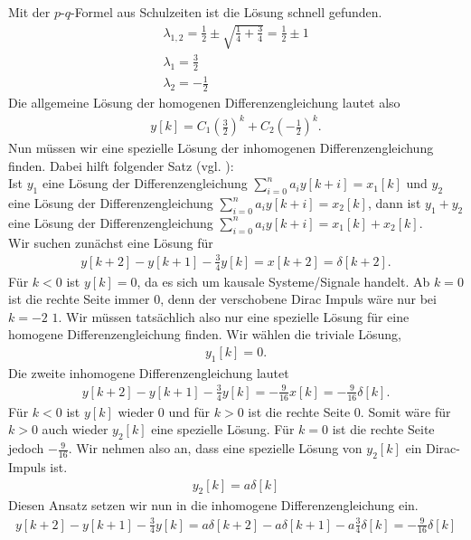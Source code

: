 \documentclass[11pt,a4paper,DIV=12]{scrartcl}
\begin{document}
%
Mit der $p$-$q$-Formel aus Schulzeiten ist die Lösung schnell gefunden.
%
\begin{gather}
	\lambda_{1,2}=\frac{1}{2}\pm \sqrt{\frac{1}{4}+\frac{3}{4}}=\frac{1}{2}\pm 1\\
	\lambda_1=\frac{3}{2}\\
	\lambda_2=-\frac{1}{2}
\end{gather}
%
Die allgemeine Lösung der homogenen Differenzengleichung lautet also
%
\begin{gather}
	y[k]=C_1\left(\frac{3}{2}\right)^k+C_2\left(-\frac{1}{2}\right)^k.
\end{gather}
%
Nun müssen wir eine spezielle Lösung der inhomogenen Differenzengleichung 
finden. 
%
Dabei hilft folgender Satz (vgl. \cite[Kap. 5 S. 83]{Witt2013}):\\
%
Ist $y_1$ eine Lösung der Differenzengleichung $\sum_{i=0}^na_iy[k+i]=x_1[k]$ 
und $y_2$ eine Lösung der Differenzengleichung $\sum_{i=0}^na_iy[k+i]=x_2[k]$, 
dann ist $y_1+y_2$ eine Lösung der Differenzengleichung 
$\sum_{i=0}^{n}a_iy[k+i]=x_1[k]+x_2[k]$.\\
%
Wir suchen zunächst eine Lösung für
%
\begin{gather}
	y[k+2]-y[k+1]-\frac{3}{4}y[k]=x[k+2]=\delta[k+2].
\end{gather}
%
Für $k<0$ ist $y[k]=0$, da es sich um kausale Systeme/Signale handelt. 
%
Ab $k=0$ ist die rechte Seite immer $0$, denn der verschobene Dirac Impuls wäre 
nur bei $k=-2$ $1$. Wir müssen tatsächlich also nur eine spezielle Lösung für 
eine homogene Differenzengleichung finden. 
%
Wir wählen die triviale Lösung,
%
\begin{gather}
	y_1[k]=0.
\end{gather}
%
Die zweite inhomogene Differenzengleichung lautet
%
\begin{gather}
	y[k+2]-y[k+1]-\frac{3}{4}y[k]=-\frac{9}{16}x[k]=-\frac{9}{16}\delta[k].
\end{gather}
%
Für $k<0$ ist $y[k]$ wieder $0$ und für $k>0$ ist die rechte Seite $0$. 
%
Somit wäre für $k>0$ auch wieder $y_2[k]$ eine spezielle Lösung. 
%
Für $k=0$ ist die rechte Seite jedoch $-\frac{9}{16}$. 
%
Wir nehmen also an, dass eine spezielle Lösung von $y_2[k]$ ein 
Dirac-Impuls ist.
%
\begin{gather}
	y_2[k]=a\delta[k]
\end{gather}
%
Diesen Ansatz setzen wir nun in die inhomogene Differenzengleichung ein.
%
\begin{gather}
	y[k+2]-y[k+1]-\frac{3}{4}y[k]=a\delta[k+2]-a\delta[k+1]-a\frac{3}{4}\delta[k]=-\frac{9}{16}\delta[k]
\end{gather}
\end{document}
